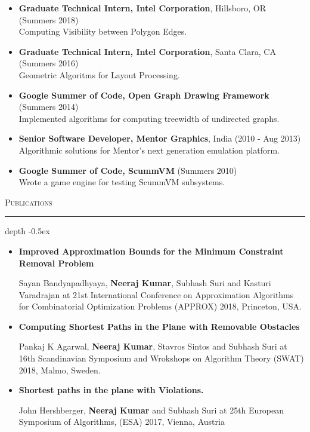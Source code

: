\documentclass[11pt]{article}
\def\Vhrulefill{\leavevmode\leaders\hrule height 1.2ex depth \dimexpr2pt-0.5ex\hfill\kern0pt}
\begin{document}
{\begin{itemize}
	\item \textbf{Graduate Technical Intern, Intel Corporation}, Hillsboro, OR \hfill(Summers 2018) \\
        Computing Visibility between Polygon Edges.
	
	\item \textbf{Graduate Technical Intern, Intel Corporation}, Santa Clara, CA \hfill(Summers 2016) \\
        Geometric Algoritms for Layout Processing.
	
    \item \textbf{Google Summer of Code, Open Graph Drawing Framework} \hfill(Summers 2014) \\
		Implemented algorithms for computing treewidth of undirected graphs.

	\item \textbf{Senior Software Developer, Mentor Graphics}, India \hfill(2010 - Aug 2013) \\
		Algorithmic solutions for Mentor's next generation emulation platform.
	
	\item \textbf{Google Summer of Code, ScummVM} \hfill(Summers 2010) \\
		Wrote a game engine for testing ScummVM subsystems.
\end{itemize}

\medskip
\noindent\textsc{Publications}
\textcolor{mygray}{\noindent\Vhrulefill}
\begin{itemize}
    \item \textbf{Improved Approximation Bounds for the Minimum Constraint Removal Problem}
				
				Sayan Bandyapadhyaya,  \textbf{Neeraj Kumar}, Subhash Suri and Kasturi Varadrajan at
				21st International Conference on Approximation Algorithms for Combinatorial Optimization Problems (APPROX) 2018,
				Princeton, USA.


    \item \textbf{Computing Shortest Paths in the Plane with Removable Obstacles}
        
        Pankaj K Agarwal, \textbf{Neeraj Kumar}, Stavros Sintos and Subhash Suri at
				16th Scandinavian Symposium and Wrokshops on Algorithm Theory (SWAT) 2018, Malmo, Sweden.
    
    \item \textbf{Shortest paths in the plane with Violations.}

        John Hershberger, \textbf{Neeraj Kumar} and Subhash Suri at
        25th European Symposium of Algorithms, (ESA) 2017, Vienna, Austria



\end{itemize}}
\end{document}

